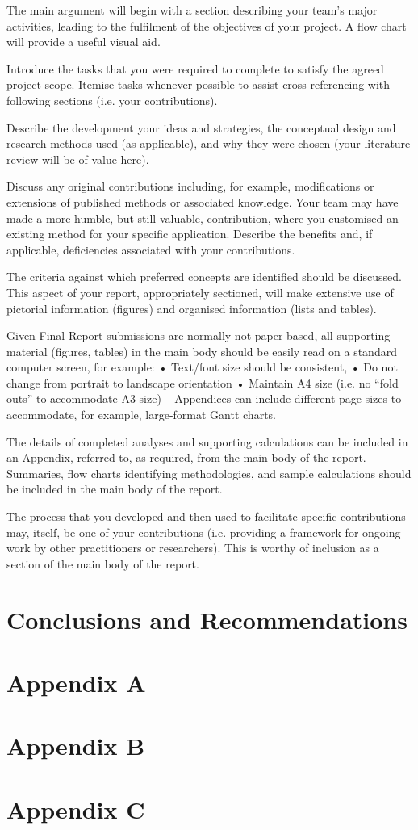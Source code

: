 \documentclass[]{article}
\begin{document}
The main argument will begin with a section describing your team’s major activities, leading to the fulfilment of the objectives of your project.  A flow chart will provide a useful visual aid.

Introduce the tasks that you were required to complete to satisfy the agreed project scope.  Itemise tasks whenever possible to assist cross-referencing with following sections (i.e. your contributions).

Describe the development your ideas and strategies, the conceptual design and research methods used (as applicable), and why they were chosen (your literature review will be of value here).  

Discuss any original contributions including, for example, modifications or extensions of published methods or associated knowledge.  Your team may have made a more humble, but still valuable, contribution, where you customised an existing method for your specific application.  Describe the benefits and, if applicable, deficiencies associated with your contributions.

The criteria against which preferred concepts are identified should be discussed.  This aspect of your report, appropriately sectioned, will make extensive use of pictorial information (figures) and organised information (lists and tables).  

Given Final Report submissions are normally not paper-based, all supporting material (figures, tables) in the main body should be easily read on a standard computer screen, for example:
•	Text/font size should be consistent, 
•	Do not change from portrait to landscape orientation 
•	Maintain A4 size (i.e. no “fold outs” to accommodate A3 size) – Appendices can include different page sizes to accommodate, for example, large-format Gantt charts.

The details of completed analyses and supporting calculations can be included in an Appendix, referred to, as required, from the main body of the report.  Summaries, flow charts identifying methodologies, and sample calculations should be included in the main body of the report.

The process that you developed and then used to facilitate specific contributions may, itself, be one of your contributions (i.e. providing a framework for ongoing work by other practitioners or researchers).  This is worthy of inclusion as a section of the main body of the report.

\section{Conclusions and Recommendations}


\newpage


\appendix
\newpage
\section*{Appendix A}


\newpage
\section*{Appendix B}


\section*{Appendix C}

\end{document}
